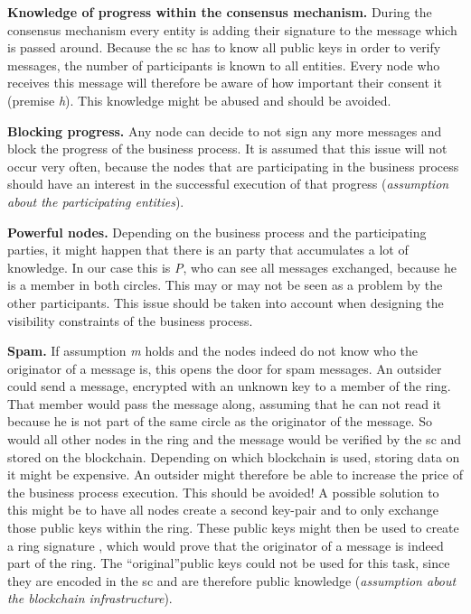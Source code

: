 \documentclass[runningheads]{llncs}
\newcommand{\ber}[1]{\textit{#1}}
\renewcommand{\bigbreak}{}
\newcommand{\quotel}{``}
\newcommand{\quoter}{''}
\begin{document}
\bigbreak
\textbf{Knowledge of progress within the consensus mechanism.} During the consensus mechanism every entity is adding their signature to the message which is passed around. Because the sc has to know all public keys in order to verify messages, the number of participants is known to all entities. Every node who receives this message will therefore be aware of how important their consent it (premise \ber{h}). This knowledge might be abused and should be avoided.


\bigbreak
\textbf{Blocking progress.} Any node can decide to not sign any more messages and block the progress of the business process. It is assumed that this issue will not occur very often, because the nodes that are participating in the business process should have an interest in the successful execution of that progress (\textit{assumption about the participating entities}).


\bigbreak
\textbf{Powerful nodes.} Depending on the business process and the participating parties, it might happen that there is an party that accumulates a lot of knowledge. In our case this is \ber{P}, who can see all messages exchanged, because he is a member in both circles. This may or may not be seen as a problem by the other participants. This issue should be taken into account when designing the visibility constraints of the business process. 


\bigbreak
\textbf{Spam.} If assumption \ber{m} holds and the nodes indeed do not know who the originator of a message is, this opens the door for spam messages. An outsider could send a message, encrypted with an unknown key to a member of the ring. That member would pass the message along, assuming that he can not read it because he is not part of the same circle as the originator of the message. So would all other nodes in the ring and the message would be verified by the sc and stored on the blockchain. Depending on which blockchain is used, storing data on it might be expensive. An outsider might therefore be able to increase the price of the business process execution. This should be avoided! A possible solution to this might be to have all nodes create a second key-pair and to only exchange those public keys within the ring. These public keys might then be used to create a ring signature \cite{rivest2001leak}, which would prove that the originator of a message is indeed part of the ring. The \quotel original\quoter  public keys could not be used for this task, since they are encoded in the sc and are therefore public knowledge (\textit{assumption about the blockchain infrastructure}).
\end{document}
